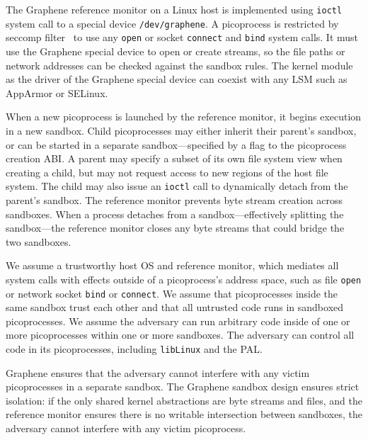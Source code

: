 The Graphene reference monitor on a Linux host
is implemented using {\tt ioctl} system call to a special device {\tt /dev/graphene}.
A picoprocess is restricted by seccomp filter~\citep{seccomp} to use any {\tt open} or socket {\tt connect} and {\tt bind} system calls.
It must use the Graphene special device to open or create streams,
so the file paths or network addresses can be checked against the sandbox rules.
The kernel module as the driver of the Graphene special device can coexist with any LSM such as AppArmor or SELinux.


When a new picoprocess is launched by the reference monitor, it begins execution in 
a new sandbox.  
Child picoprocesses may either inherit their parent's sandbox, 
or can be started in a separate sandbox---specified
by a flag to the picoprocess creation ABI.
A parent may specify a subset of its own file system view 
when creating a child, but may not request access to new regions of the 
host file system. 
The child may also issue an {\tt ioctl} call to 
dynamically detach from the parent's sandbox. The reference monitor prevents byte stream creation 
across sandboxes.
When a process detaches from a sandbox---effectively splitting the sandbox---the
reference monitor closes
any byte streams that could bridge the two sandboxes.

\vspace{5pt}
We assume  a trustworthy host OS and reference monitor,
which mediates all system calls with effects outside of a picoprocess's address space,
such as file {\tt open} or network socket {\tt bind} or {\tt connect}.
We assume that picoprocesses inside the same sandbox trust each other and that all untrusted code runs in sandboxed picoprocesses.
We assume the adversary can run arbitrary code inside of
one or more picoprocesses within one or more sandboxes.
The adversary can control all code in its
picoprocesses, including {\tt libLinux} and the PAL. 

Graphene ensures that %
the adversary cannot interfere with any victim picoprocesses
in a separate sandbox.  
The Graphene sandbox design ensures strict isolation: 
if the only shared kernel abstractions are byte streams and files, 
and the reference monitor ensures
there is no writable intersection between sandboxes,
the adversary cannot interfere with any victim picoprocess.


